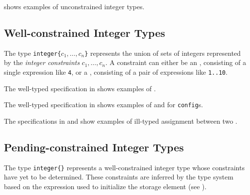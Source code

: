 shows examples of unconstrained integer types.

\subsection{Well-constrained Integer Types}
%
The type \texttt{integer\{$c_1,\ldots,c_n$\}} represents the
union of sets of integers represented by the \emph{integer constraints} $c_1,\ldots,c_n$.
\hypertarget{def-exactconstraintterm}{}
\hypertarget{def-rangeconstraintterm}{}
A constraint can either be an \emph{\exactconstraintterm}, consisting of a single expression like \texttt{4},
or a \emph{\rangeconstraintterm}, consisting of a pair of expressions like \texttt{1..10}.

\hypertarget{def-wellconstrainedintegertype}{}
The well-typed specification in  shows examples of \wellconstrainedintegertypesterm.

The well-typed specification in  shows examples of \wellconstrainedintegertypesterm{}
and \unconstrainedintegertypesterm{} for \verb|config|s.

The specifications in 
and 
show examples of ill-typed
assignment between two \wellconstrainedintegertypesterm{}.

\subsection{Pending-constrained Integer Types}
\hypertarget{def-pendingconstrainedintegertype}{}
The type \verb|integer{}| represents a well-constrained integer type whose
constraints have yet to be determined.
These constraints are inferred by the type system based on the expression used to initialize
the storage element (see ).

